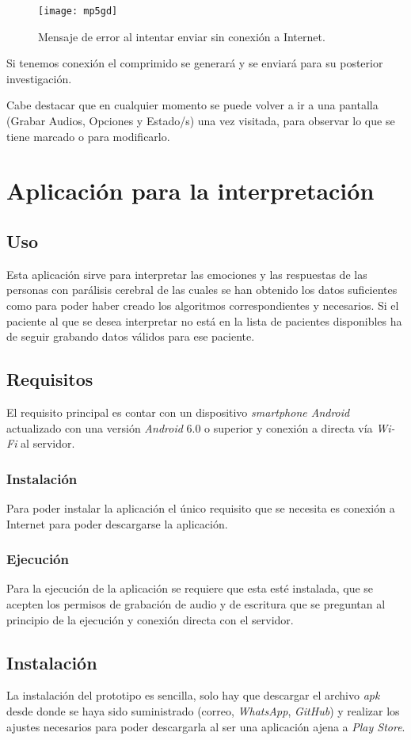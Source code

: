\begin{figure}[H]
	\centering
	\texttt{[image: mp5gd]}
	\caption{Mensaje de error al intentar enviar sin conexión a Internet.}
	\label{fig:mp5gd}
\end{figure}

Si tenemos conexión el comprimido se generará y se enviará para su posterior investigación.

Cabe destacar que en cualquier momento se puede volver a ir a una pantalla (Grabar Audios, Opciones y Estado/s) una vez visitada, para observar lo que se tiene marcado o para modificarlo.
\newpage
\section{Aplicación para la interpretación}
\subsection{Uso}
Esta aplicación sirve para interpretar las emociones y las respuestas de las personas con parálisis cerebral de las cuales se han obtenido los datos suficientes como para poder haber creado los algoritmos correspondientes y necesarios. Si el paciente al que se desea interpretar no está en la lista de pacientes disponibles ha de seguir grabando datos válidos para ese paciente.
\subsection{Requisitos}
El requisito principal es contar con un dispositivo \textit{smartphone Android} actualizado con una versión \textit{Android} 6.0 o superior y conexión a directa vía \textit{Wi-Fi} al servidor.
\subsubsection{Instalación}
Para poder instalar la aplicación el único requisito que se necesita es conexión a Internet para poder descargarse la aplicación.
\subsubsection{Ejecución}
Para la ejecución de la aplicación se requiere que esta esté instalada, que se acepten los permisos de grabación de audio y de escritura que se preguntan al principio de la ejecución y conexión directa con el servidor.
\subsection{Instalación}
La instalación del prototipo es sencilla, solo hay que descargar el archivo \textit{apk} desde donde se haya sido suministrado (correo, \textit{WhatsApp}, \textit{GitHub}) y realizar los ajustes necesarios para poder descargarla al ser una aplicación ajena a \textit{Play Store}.


